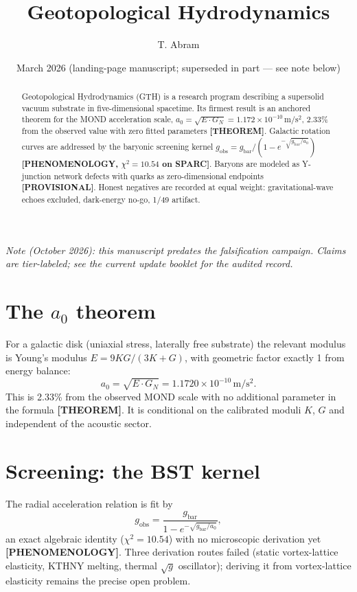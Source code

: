 \documentclass[11pt,a4paper]{article}
\title{Geotopological Hydrodynamics}
\author{T. Abram}
\date{March 2026 (landing-page manuscript; superseded in part --- see note below)}
\newcommand{\tier}[1]{\textbf{[#1]}}
\begin{document}
\maketitle

\begin{abstract}
Geotopological Hydrodynamics (GTH) is a research program describing a supersolid vacuum
substrate in five-dimensional spacetime. Its firmest result is an anchored theorem for the
MOND acceleration scale, $a_0 = \sqrt{E\cdot G_N} = 1.172\times 10^{-10}\,\mathrm{m/s^2}$,
2.33\% from the observed value with zero fitted parameters \tier{THEOREM}. Galactic rotation
curves are addressed by the baryonic screening kernel
$g_{\mathrm{obs}} = g_{\mathrm{bar}}/(1-e^{-\sqrt{g_{\mathrm{bar}}/a_0}})$
\tier{PHENOMENOLOGY, $\chi^2 = 10.54$ on SPARC}. Baryons are modeled as Y-junction network
defects with quarks as zero-dimensional endpoints \tier{PROVISIONAL}. Honest negatives are
recorded at equal weight: gravitational-wave echoes excluded, dark-energy no-go, 1/49 artifact.
\end{abstract}

\noindent\textit{Note (October 2026): this manuscript predates the falsification campaign.
Claims are tier-labeled; see the current update booklet for the audited record.}

\section{The \texorpdfstring{$a_0$}{a0} theorem}
For a galactic disk (uniaxial stress, laterally free substrate) the relevant modulus is Young's
modulus $E = 9KG/(3K+G)$, with geometric factor exactly 1 from energy balance:
\begin{equation}
a_0 = \sqrt{E\cdot G_N} = 1.1720\times 10^{-10}\,\mathrm{m/s^2}.
\end{equation}
This is 2.33\% from the observed MOND scale with no additional parameter in the formula
\tier{THEOREM}. It is conditional on the calibrated moduli $K$, $G$ and independent of the
acoustic sector.

\section{Screening: the BST kernel}
The radial acceleration relation is fit by
\begin{equation}
g_{\mathrm{obs}} = \frac{g_{\mathrm{bar}}}{1-e^{-\sqrt{g_{\mathrm{bar}}/a_0}}},
\end{equation}
an exact algebraic identity ($\chi^2 = 10.54$) with no microscopic derivation yet
\tier{PHENOMENOLOGY}. Three derivation routes failed (static vortex-lattice elasticity,
KTHNY melting, thermal $\sqrt{g}$ oscillator); deriving it from vortex-lattice elasticity
remains the precise open problem.
\end{document}
